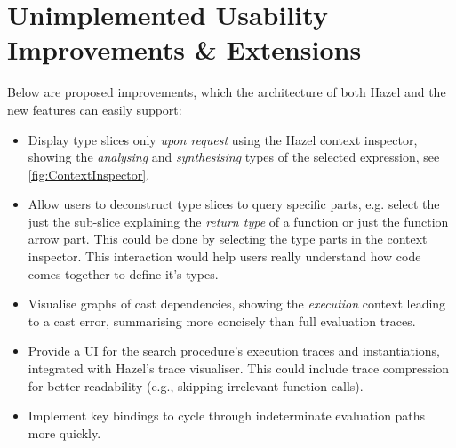 \chapter{Unimplemented Usability Improvements \& Extensions}\label{sec:UIImprovements}
 Below are proposed improvements, which the architecture of both Hazel and the new features can easily support:

\begin{itemize}
\item Display type slices only \textit{upon request} using the Hazel context inspector, showing the \textit{analysing} and \textit{synthesising} types of the selected expression, see \cref{fig:ContextInspector}.
\item Allow users to deconstruct type slices to query specific parts, e.g. select the just the sub-slice explaining the \textit{return type} of a function or just the function arrow part. This could be done by selecting the type parts in the context inspector.
This interaction would help users really understand how code comes together to define it's types.
\item Visualise graphs of cast dependencies, showing the \textit{execution} context leading to a cast error, summarising more concisely than full evaluation traces.
\item Provide a UI for the search procedure's execution traces and instantiations, integrated with Hazel's trace visualiser. This could include trace compression for better readability (e.g., skipping irrelevant function calls).
\item Implement key bindings to cycle through indeterminate evaluation paths more quickly.
\end{itemize}